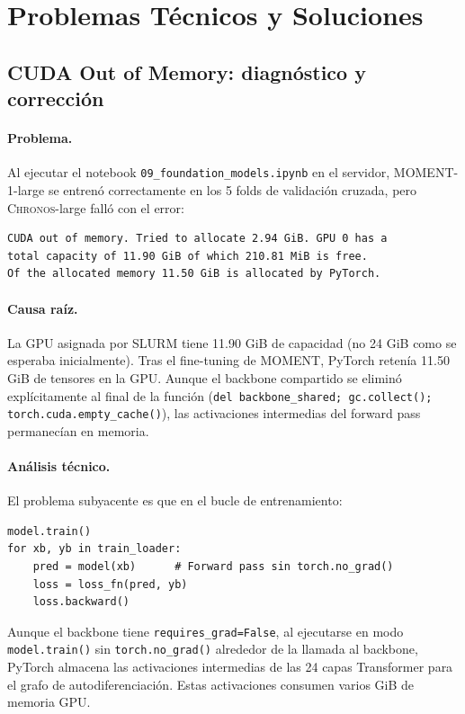 \documentclass[12pt, a4paper]{article}
\newcommand{\code}[1]{\texttt{#1}}
\newcommand{\moment}{\textsc{MOMENT}}
\newcommand{\chronos}{\textsc{Chronos}}
\begin{document}
\section{Problemas Técnicos y Soluciones}
\label{sec:problemas}

\subsection{CUDA Out of Memory: diagnóstico y corrección}
\label{sec:problemas_oom}

\paragraph{Problema.}
Al ejecutar el notebook \code{09\_foundation\_models.ipynb} en el servidor, \moment{}-1-large se entrenó correctamente en los 5 folds de validación cruzada, pero \chronos{}-large falló con el error:

\begin{verbatim}
CUDA out of memory. Tried to allocate 2.94 GiB. GPU 0 has a
total capacity of 11.90 GiB of which 210.81 MiB is free.
Of the allocated memory 11.50 GiB is allocated by PyTorch.
\end{verbatim}

\paragraph{Causa raíz.}
La GPU asignada por SLURM tiene 11.90 GiB de capacidad (no 24 GiB como se esperaba inicialmente). Tras el fine-tuning de \moment{}, PyTorch retenía 11.50 GiB de tensores en la GPU. Aunque el backbone compartido se eliminó explícitamente al final de la función (\code{del backbone\_shared; gc.collect(); torch.cuda.empty\_cache()}), las activaciones intermedias del forward pass permanecían en memoria.

\paragraph{Análisis técnico.}
El problema subyacente es que en el bucle de entrenamiento:
\begin{lstlisting}
model.train()
for xb, yb in train_loader:
    pred = model(xb)      # Forward pass sin torch.no_grad()
    loss = loss_fn(pred, yb)
    loss.backward()
\end{lstlisting}
Aunque el backbone tiene \code{requires\_grad=False}, al ejecutarse en modo \code{model.train()} sin \code{torch.no\_grad()} alrededor de la llamada al backbone, PyTorch almacena las activaciones intermedias de las 24 capas Transformer para el grafo de autodiferenciación. Estas activaciones consumen varios GiB de memoria GPU.
\end{document}
